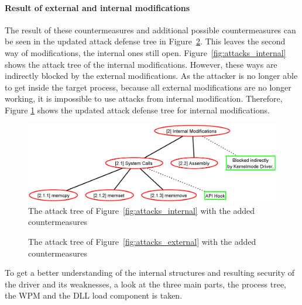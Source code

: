 \paragraph{Result of external and internal modifications}
The result of these countermeasures and additional possible countermeasures can be seen in the updated attack defense tree in Figure~\ref{fig:attacks_external_def}. This leaves the second way of modifications, the internal ones still open. Figure~\ref{fig:attacks_internal} shows the attack tree of the internal modifications. However, these ways are indirectly blocked by the external modifications. As the attacker is no longer able to get inside the target process, because all external modifications are no longer working, it is impossible to use attacks from internal modification. Therefore, Figure \ref{fig:attacks_internal_def} shows the updated attack defense tree for internal modifications.
\begin{figure}[h]
\centering
\includegraphics[scale=0.25]{sections/adtrees/InternalModifications.png}
\caption{The attack tree of Figure~\ref{fig:attacks_internal} with the added countermeasures}
\label{fig:attacks_internal_def}
\end{figure}
\begin{figure}[h] 
 \centering
\caption{The attack tree of Figure~\ref{fig:attacks_external} with the added countermeasures}
\label{fig:attacks_external_def}
\end{figure}
\restoregeometry
To get a better understanding of the internal structures and resulting security of the driver and its weaknesses, a look at the three main parts, the process tree, the \gls{WPM} and the \gls{DLL} load component is taken.

